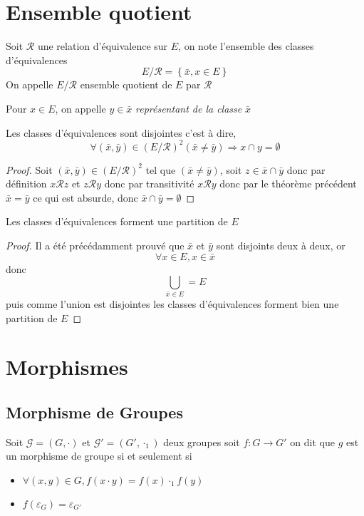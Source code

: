 \documentclass[11pt,colorlinks]{book}
\theoremstyle{mytheoremstyle}
\theoremstyle{mytheoremstyle}
\theoremstyle{mytheoremstyle}
\theoremstyle{mytheoremstyle}
\theoremstyle{mytheoremstyle}
\theoremstyle{mytheoremstyle}
\theoremstyle{mytheoremstyle}
\theoremstyle{mytheoremstyle}
\theoremstyle{myproblemstyle}
\def\mfc#1{\mathcal{#1}}
\def\mR{\mfc{R}}
\begin{document}
\section{Ensemble quotient}
\begin{definition}
  Soit $\mR$ une relation d'équivalence sur $E$, on note l'ensemble des classes d'équivalences 
  \begin{equation*}
    E/\mR = \left\{\bar{x},x \in E\right\}
  \end{equation*}
  On appelle $E/\mR$ ensemble quotient de $E$ par $\mR$
\end{definition}
\begin{rmq}
  Pour $x \in E$, on appelle $y \in \bar{x}$ \textit{représentant de la classe} $\bar{x}$
\end{rmq}
\begin{prop}
  Les classes d'équivalences sont disjointes c'est à dire, 
  \begin{equation*}
    \forall (\bar{x},\bar{y}) \in (E/\mR)^2 (\bar{x}\not= \bar{y}) \Rightarrow x \cap y = \emptyset
  \end{equation*}
  \begin{proof}
    Soit $(\bar{x},\bar{y}) \in (E/\mR)^2$ tel que $(\bar{x}\not= \bar{y})$, soit $z \in \bar{x} \cap \bar{y}$ donc par définition
    $x \mR z$ et $z \mR y$ donc par transitivité $x \mR y$ donc par le théorème précédent $\bar{x} =\bar{y}$ ce qui est absurde, donc $\bar{x} \cap \bar{y} = \emptyset$
  \end{proof}
\end{prop}
\begin{prop}
  Les classes d'équivalences forment une partition de $E$
  \begin{proof}
    Il a été précédamment prouvé que $\bar{x}$ et $\bar{y}$ sont disjoints deux à deux, or 
    \begin{equation*}
      \forall x \in E, x \in \bar{x} 
    \end{equation*}
    donc 
    \begin{equation*}
      \bigcup_{\bar{x}\in E} = E
    \end{equation*}
    puis comme l'union est disjointes les classes d'équivalences forment bien une partition de $E$
  \end{proof}
\end{prop}
\section{Morphismes}
\subsection{Morphisme de Groupes}
\begin{definition}
  Soit $\mathcal G = (G,\cdot)$ et $\mathcal G' = (G',\cdot_1)$ deux groupes soit $f : G \to G'$ on dit que $g$ est un morphisme de groupe si et seulement si 
  \begin{itemize}
    \item $\forall (x,y) \in G, f(x \cdot y) = f(x) \cdot_1 f(y)$ 
    \item $f(\varepsilon_{G}) = \varepsilon_{G'}$
  \end{itemize}
\end{definition}
\end{document}

